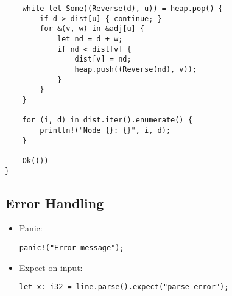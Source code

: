 \documentclass[letterpaper,landscape]{article}
\begin{document}
\begin{multicols*}{3}
\begin{verbatim}
    while let Some((Reverse(d), u)) = heap.pop() {
        if d > dist[u] { continue; }
        for &(v, w) in &adj[u] {
            let nd = d + w;
            if nd < dist[v] {
                dist[v] = nd;
                heap.push((Reverse(nd), v));
            }
        }
    }

    for (i, d) in dist.iter().enumerate() {
        println!("Node {}: {}", i, d);
    }

    Ok(())
}
\end{verbatim}

\subsection*{Error Handling}
\begin{itemize}
\item Panic:
\begin{verbatim}
panic!("Error message");
\end{verbatim}

\item Expect on input:
\begin{verbatim}
let x: i32 = line.parse().expect("parse error");
\end{verbatim}
\end{itemize}

\end{multicols*}
\end{document}
